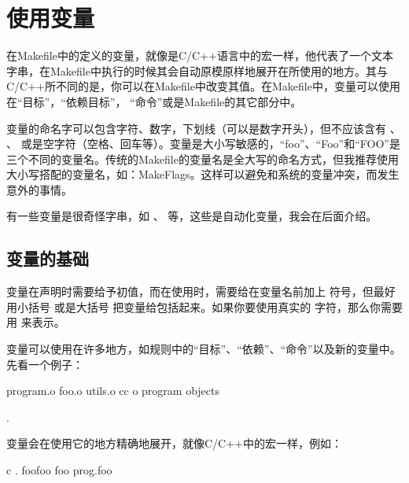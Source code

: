 \documentclass[a4paper,10pt]{sphinxmanual}
\begin{document}
\chapter{使用变量}
\label{\detokenize{variables:id1}}\label{\detokenize{variables::doc}}
在Makefile中的定义的变量，就像是C/C++语言中的宏一样，他代表了一个文本字串，在Makefile中执行的时候其会自动原模原样地展开在所使用的地方。其与C/C++所不同的是，你可以在Makefile中改变其值。在Makefile中，变量可以使用在“目标”，“依赖目标”， “命令”或是Makefile的其它部分中。

变量的命名字可以包含字符、数字，下划线（可以是数字开头），但不应该含有 \sphinxcode{\sphinxupquote{:}} 、 \sphinxcode{\sphinxupquote{\#}} 、
\sphinxcode{\sphinxupquote{=}} 或是空字符（空格、回车等）。变量是大小写敏感的，“foo”、“Foo”和“FOO”是三个不同的变量名。传统的Makefile的变量名是全大写的命名方式，但我推荐使用大小写搭配的变量名，如：MakeFlags。这样可以避免和系统的变量冲突，而发生意外的事情。

有一些变量是很奇怪字串，如 \sphinxcode{\sphinxupquote{\$\textless{}}} 、  等，这些是自动化变量，我会在后面介绍。


\section{变量的基础}
\label{\detokenize{variables:id2}}
变量在声明时需要给予初值，而在使用时，需要给在变量名前加上 \sphinxcode{\sphinxupquote{\$}} 符号，但最好用小括号
\sphinxcode{\sphinxupquote{()}} 或是大括号 \sphinxcode{\sphinxupquote{\{\}}} 把变量给包括起来。如果你要使用真实的 \sphinxcode{\sphinxupquote{\$}} 字符，那么你需要用
\sphinxcode{\sphinxupquote{\$\$}} 来表示。

变量可以使用在许多地方，如规则中的“目标”、“依赖”、“命令”以及新的变量中。先看一个例子：

\begin{sphinxVerbatim}[commandchars=\\\{\}]
  program.o foo.o utils.o
 
    cc \PYGZhy{}o program objects

 .
\end{sphinxVerbatim}

变量会在使用它的地方精确地展开，就像C/C++中的宏一样，例如：

\begin{sphinxVerbatim}[commandchars=\\\{\}]
  c
 .
    foofoo \PYGZhy{}foo prog.foo
\end{sphinxVerbatim}
\end{document}
